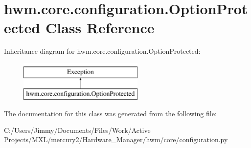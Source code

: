 \hypertarget{classhwm_1_1core_1_1configuration_1_1_option_protected}{\section{hwm.\-core.\-configuration.\-Option\-Protected Class Reference}
\label{classhwm_1_1core_1_1configuration_1_1_option_protected}
}
Inheritance diagram for hwm.\-core.\-configuration.\-Option\-Protected\-:\begin{figure}[H]
\begin{center}
\leavevmode
\includegraphics[height=2.000000cm]{classhwm_1_1core_1_1configuration_1_1_option_protected}
\end{center}
\end{figure}


The documentation for this class was generated from the following file\-:\begin{DoxyCompactItemize}
\item 
C\-:/\-Users/\-Jimmy/\-Documents/\-Files/\-Work/\-Active Projects/\-M\-X\-L/mercury2/\-Hardware\-\_\-\-Manager/hwm/core/configuration.\-py\end{DoxyCompactItemize}
